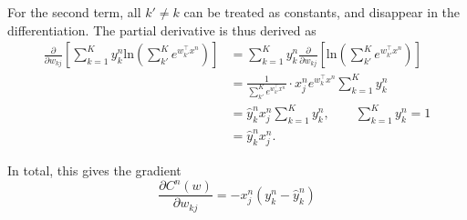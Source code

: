 For the second term, all $k' \neq k$ can be treated as constants, and disappear in the differentiation. The partial derivative is thus derived as 
\begin{align*}
  \frac{\partial}{\partial w_{kj}} \left[ \sum_{k=1}^K y_k^n \text{ln}\left(\sum_{k'}^K e^{w_{k'}^\top x^n}\right)\right] &= \sum_{k=1}^K y_k^n \frac{\partial}{\partial w_{kj}}\left[\text{ln}\left(\sum_{k'}^K e^{w_{k'}^\top x^n} \right)  \right] \\
                                                                                                                          &= \frac{1}{\sum_{k'}^K e^{w_{k'}^\top x^n}} \cdot x_j^n e^{w_k^\top x^n} \sum_{k=1}^K y_k^n \\
                                                                                                                          &= \hat{y}_k^n x_j^n \sum_{k=1}^{K} y_k^n, \quad\quad \sum_{k=1}^K y_k^n=1 \\
                                                                                                                          &= \hat{y}_k^n x_j^n.
\end{align*}

In total, this gives the gradient
\begin{equation*}
  \frac{\partial C^n(w)}{\partial w_{kj}} = -x_j^n (y_k^n - \hat{y}_k^n)
\end{equation*}

